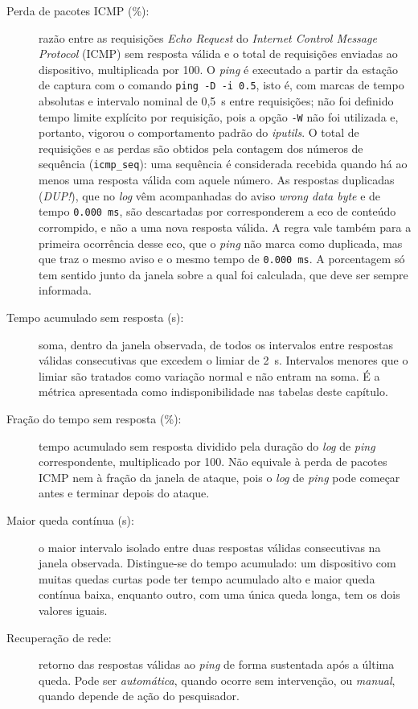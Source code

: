 \begin{description}
    \item[Perda de pacotes ICMP (\%):] razão entre as requisições \textit{Echo Request} do \textit{Internet Control Message Protocol} (ICMP) sem resposta válida e o total de requisições enviadas ao dispositivo, multiplicada por 100. O \textit{ping} é executado a partir da estação de captura com o comando \texttt{ping -D -i 0.5}, isto é, com marcas de tempo absolutas e intervalo nominal de 0,5~s entre requisições; não foi definido tempo limite explícito por requisição, pois a opção \texttt{-W} não foi utilizada e, portanto, vigorou o comportamento padrão do \textit{iputils}. O total de requisições e as perdas são obtidos pela contagem dos números de sequência (\texttt{icmp\_seq}): uma sequência é considerada recebida quando há ao menos uma resposta válida com aquele número. As respostas duplicadas (\textit{DUP!}), que no \textit{log} vêm acompanhadas do aviso \textit{wrong data byte} e de tempo \texttt{0.000~ms}, são descartadas por corresponderem a eco de conteúdo corrompido, e não a uma nova resposta válida. A regra vale também para a primeira ocorrência desse eco, que o \textit{ping} não marca como duplicada, mas que traz o mesmo aviso e o mesmo tempo de \texttt{0.000~ms}. A porcentagem só tem sentido junto da janela sobre a qual foi calculada, que deve ser sempre informada.
    \item[Tempo acumulado sem resposta (s):] soma, dentro da janela observada, de todos os intervalos entre respostas válidas consecutivas que excedem o limiar de 2~s. Intervalos menores que o limiar são tratados como variação normal e não entram na soma. É a métrica apresentada como indisponibilidade nas tabelas deste capítulo.
    \item[Fração do tempo sem resposta (\%):] tempo acumulado sem resposta dividido pela duração do \textit{log} de \textit{ping} correspondente, multiplicado por 100. Não equivale à perda de pacotes ICMP nem à fração da janela de ataque, pois o \textit{log} de \textit{ping} pode começar antes e terminar depois do ataque.
    \item[Maior queda contínua (s):] o maior intervalo isolado entre duas respostas válidas consecutivas na janela observada. Distingue-se do tempo acumulado: um dispositivo com muitas quedas curtas pode ter tempo acumulado alto e maior queda contínua baixa, enquanto outro, com uma única queda longa, tem os dois valores iguais.
    \item[Recuperação de rede:] retorno das respostas válidas ao \textit{ping} de forma sustentada após a última queda. Pode ser \textit{automática}, quando ocorre sem intervenção, ou \textit{manual}, quando depende de ação do pesquisador.

\end{description}
